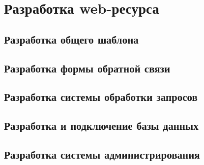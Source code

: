 \section{Разработка web-ресурса}
    \subsection{Разработка общего шаблона}
    
    \subsection{Разработка формы обратной связи}
    
    \subsection{Разработка системы обработки запросов}
    
    \subsection{Разработка и подключение базы данных}
    
    \subsection{Разработка системы администрирования}
    

\clearpage
